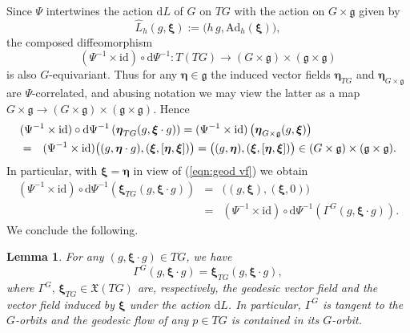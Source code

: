 \documentclass[12pt,a4paper]{article}
\theoremstyle{plain}
\newtheorem{lem}[thm]{Lemma}%
\theoremstyle{definition}
\begin{document}
Since $\Psi$ intertwines the action $\mathrm{d}L$  of $G$ on $TG$ 
with the action on $G\times \mathfrak{g}$
given by
$$
\hat{L}_h(g,\boldsymbol{\xi}):=\big(h\,g,
\mathrm{Ad}_h(\boldsymbol{\xi})\big),
$$
the composed diffeomorphism
$$
(\Psi^{-1}\times \mathrm{id})\circ 
\mathrm{d}\Psi^{-1}:T(TG)\rightarrow (G\times \mathfrak{g})
\times (\mathfrak{g}\times \mathfrak{g})
$$
is also $G$-equivariant.
%
Thus for any $\boldsymbol{\eta}\in \mathfrak{g}$ the induced vector
fields $\boldsymbol{\eta}_{TG}$ and 
$\boldsymbol{\eta}_{G\times \mathfrak{g}}$ are $\Psi$-correlated,
and abusing notation we may view the latter as a map
$G\times \mathfrak{g}\rightarrow (G\times \mathfrak{g})\times
(\mathfrak{g}\times \mathfrak{g})$. Hence
\begin{eqnarray}
\label{eqn:Psi corr eta}
\lefteqn{(\Psi^{-1}\times \mathrm{id})\circ 
\mathrm{d}\Psi^{-1}\left(\boldsymbol{\eta}_{TG}(g,\boldsymbol{\xi}\cdot g)\right)
=(\Psi^{-1}\times \mathrm{id})
\left(\boldsymbol{\eta}_{G\times \mathfrak{g}}(g,\boldsymbol{\xi}) \right)}\\
&=&(\Psi^{-1}\times \mathrm{id})\big((g,\boldsymbol{\eta}\cdot g),(\boldsymbol{\xi},
[\boldsymbol{\eta},\boldsymbol{\xi}] )   \big)
=\big((g,\boldsymbol{\eta}),(\boldsymbol{\xi},
[\boldsymbol{\eta},\boldsymbol{\xi}] )   \big)
\in (G\times \mathfrak{g})
\times (\mathfrak{g}\times \mathfrak{g}).\nonumber
\end{eqnarray}
%
In particular, with $\boldsymbol{\xi}=\boldsymbol{\eta}$ 
in view of (\ref{eqn:geod vf}) we obtain
\begin{eqnarray}
\label{eqn:eta xi geod}
(\Psi^{-1}\times \mathrm{id})\circ 
\mathrm{d}\Psi^{-1}\left(
\boldsymbol{\xi}_{TG}(g,\boldsymbol{\xi}\cdot g)\right)&=&\big((g,\boldsymbol{\xi}),(\boldsymbol{\xi},
0 )   \big)\\
&=&(\Psi^{-1}\times \mathrm{id})\circ 
\mathrm{d}\Psi^{-1}\left(\Gamma^G(g,\boldsymbol{\xi}\cdot g)\right).
\nonumber
\end{eqnarray}
We conclude the following.

\begin{lem}
\label{lem:geod vf and act}
For any $(g,\boldsymbol{\xi}\cdot g)\in TG$, we have
$$
\Gamma^G(g,\boldsymbol{\xi}\cdot g)=
\boldsymbol{\xi}_{TG}(g,\boldsymbol{\xi}\cdot g),
$$
where $\Gamma^G,\,\boldsymbol{\xi}_{TG}\in \mathfrak{X}(TG)$
are, respectively, the geodesic vector field and 
the vector field induced by $\boldsymbol{\xi}$ under
the action $\mathrm{d}L$. In particular, $\Gamma^G$ is tangent
to the $G$-orbits and the geodesic flow of any $p\in TG$ is
contained in its $G$-orbit.
\end{lem}
\end{document}
